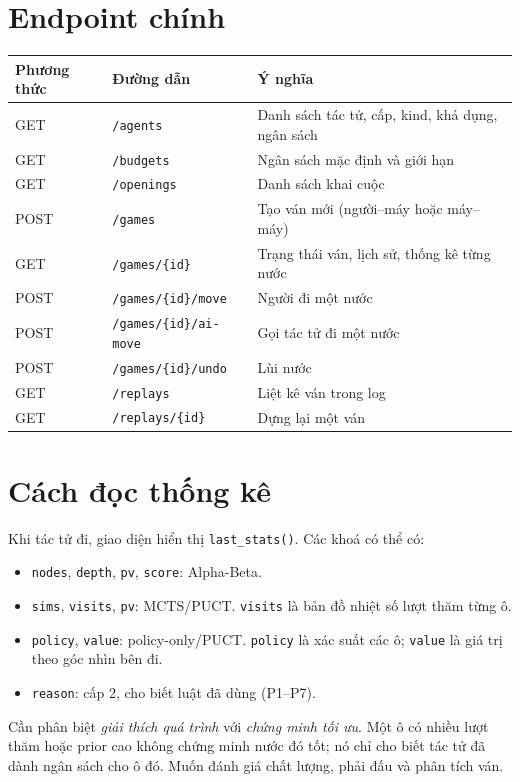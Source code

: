 \section{Endpoint chính}
\begin{center}\small
\begin{tabularx}{\textwidth}{@{}l l X@{}}
\toprule
\textbf{Phương thức} & \textbf{Đường dẫn} & \textbf{Ý nghĩa} \\
\midrule
GET & \texttt{/agents} & Danh sách tác tử, cấp, kind, khả dụng, ngân sách \\
GET & \texttt{/budgets} & Ngân sách mặc định và giới hạn \\
GET & \texttt{/openings} & Danh sách khai cuộc \\
POST & \texttt{/games} & Tạo ván mới (người--máy hoặc máy--máy) \\
GET & \texttt{/games/\{id\}} & Trạng thái ván, lịch sử, thống kê từng nước \\
POST & \texttt{/games/\{id\}/move} & Người đi một nước \\
POST & \texttt{/games/\{id\}/ai-move} & Gọi tác tử đi một nước \\
POST & \texttt{/games/\{id\}/undo} & Lùi nước \\
GET & \texttt{/replays} & Liệt kê ván trong log \\
GET & \texttt{/replays/\{id\}} & Dựng lại một ván \\
\bottomrule
\end{tabularx}
\end{center}

\section{Cách đọc thống kê}
Khi tác tử đi, giao diện hiển thị \texttt{last\_stats()}. Các khoá có thể có:
\begin{itemize}
  \item \texttt{nodes}, \texttt{depth}, \texttt{pv}, \texttt{score}: Alpha-Beta.
  \item \texttt{sims}, \texttt{visits}, \texttt{pv}: MCTS/PUCT. \texttt{visits} là bản đồ nhiệt
        số lượt thăm từng ô.
  \item \texttt{policy}, \texttt{value}: policy-only/PUCT. \texttt{policy} là xác suất các ô;
        \texttt{value} là giá trị theo góc nhìn bên đi.
  \item \texttt{reason}: cấp 2, cho biết luật đã dùng (P1--P7).
\end{itemize}
Cần phân biệt \emph{giải thích quá trình} với \emph{chứng minh tối ưu}. Một ô có nhiều lượt
thăm hoặc prior cao không chứng minh nước đó tốt; nó chỉ cho biết tác tử đã dành ngân sách cho
ô đó. Muốn đánh giá chất lượng, phải đấu và phân tích ván.

